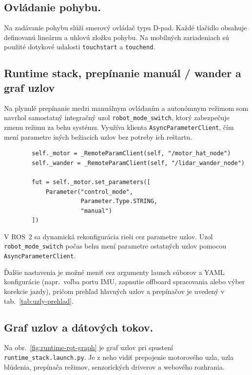         \subsection{Ovládanie pohybu.}
      
        Na zadávanie pohybu slúži smerový ovládač typu D-pad. Každé tlačidlo obsahuje definovanú lineárnu a uhlovú zložku pohybu. Na mobilných zariadeniach sú použité dotykové udalosti \texttt{touchstart} a \texttt{touchend}.
      
      
        \subsection{Runtime stack, prepínanie \texorpdfstring{manuál / wander}{manuál -- wander} a graf uzlov}
        \label{sec:mode_switch}
      
        Na plynulé prepínanie medzi manuálnym ovládaním a autonómnym režimom  som navrhol samostatný integračný uzol \texttt{robot\_mode\_switch}, ktorý zabezpečuje zmenu režimu za behu systému. Využíva klienta \texttt{AsyncParameterClient}, čím mení parametre iných bežiacich uzlov bez potreby ich reštartu.
        \begin{verbatim}
        self._motor = _RemoteParamClient(self, "/motor_hat_node")
        self._wander = _RemoteParamClient(self, "/lidar_wander_node")
      
        fut = self._motor.set_parameters([
            Parameter("control_mode",
                      Parameter.Type.STRING,
                      "manual")
        ])
        \end{verbatim}
      
      V ROS~2 sa dynamická rekonfigurácia rieši cez parametre uzlov. Uzol \texttt{robot\_mode\_switch} počas behu mení parametre ostatných uzlov pomocou \texttt{AsyncParameterClient}.

  Ďalšie nastavenia je možné meniť cez argumenty launch súborov a YAML konfigurácie (napr.\ voľba portu IMU, zapnutie offboard spracovania alebo výber korekcie jazdy), pričom prehľad hlavných uzlov a prepínačov je uvedený v tab.~\ref{tab:uzly-prehlad}.
      
        \subsection{Graf uzlov a dátových tokov.}
      
        Na obr.~\ref{fig:runtime-rqt-graph} je graf uzlov pri spustení \texttt{runtime\_stack.launch.py}. Je z neho vidiť prepojenie motorového uzla, uzla blúdenia, prepínača režimov, senzorických driverov a webového rozhrania.
      
